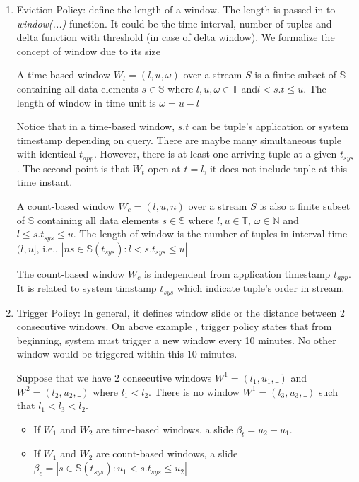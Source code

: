 \begin{enumerate}

\item Eviction Policy: define the length of a window. The length is passed in to \textit{window(...)} function. It could be the time interval, number of tuples and delta function with threshold (in case of delta window).
We formalize the concept of window due to its size

\begin{defi}
A time-based window $W_{t} = (l,u,\omega)$ over a stream $S$ is a finite subset of  $\mathbb{S}$ containing all data elements $s \in \mathbb{S}$ where $l , u, \omega \in \mathbb{T}$ and$l < s.t \leq u$. The length of window in time unit is $\omega = u-l$
\end{defi}
Notice that in a time-based window, $s.t$ can be tuple's application or system timestamp depending on query. There are maybe many simultaneous tuple with identical $t_{app}$. However, there is at least one arriving tuple at a given $t_{sys}$. The second point is that $W_t$ open at $t = l$, it does not include tuple at this time instant.

\begin{defi}
A count-based window $W_{c} = (l,u,n)$ over a stream $S$ is also a finite subset of  $\mathbb{S}$ containing all data elements $s \in \mathbb{S}$ where $l,u \in \mathbb{T}$, $\omega \in \mathbb{N}$ and $l \leq s.t_{sys} \leq u$. The length of window is the number of tuples in interval time $(l, u]$, i.e., $|n {s \in \mathbb{S}(t_{sys}): l < s.t_{sys} \leq u}|$
\end{defi}
The count-based window $W_{c}$ is independent from application timestamp $t_{app}$. It is related to system timstamp $t_{sys}$ which indicate tuple's order in stream. 


\item Trigger Policy: In general, it defines window slide or the distance between 2 consecutive windows. On above example , trigger policy states that from beginning, system must trigger a new window every 10 minutes. No other window would be triggered within this 10 minutes. 

Suppose that we have 2 consecutive windows $W^1 = (l_1, u_1, \_)$ and $W^2 = (l_2, u_2, \_)$  where $l_1 < l_2$. There is no window $W^1 = (l_3, u_3, \_)$ such that $l_1< l_3 < l_2$.
\begin{itemize}

\item If $W_1$ and $W_2$ are time-based windows, a slide $\beta_{t} = u_2 - u_1$.  
\item If $W_1$ and $W_2$ are count-based windows, a slide $\beta_{c} = |{s \in \mathbb{S}(t_{sys}): u_1 < s.t_{sys} \leq u_2}| $ 

\end{itemize}

\end{enumerate}

